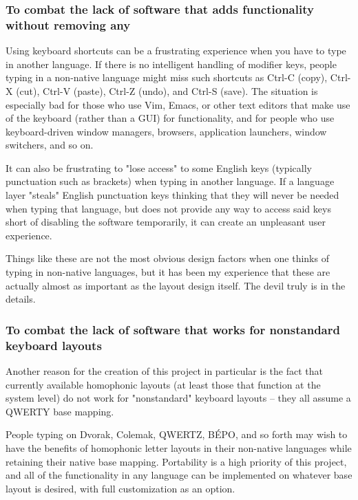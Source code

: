\documentclass[11pt]{article}
\begin{document}
\subsubsection{To combat the lack of software that adds functionality without removing any}
\label{sec:org1dcacb0}

Using keyboard shortcuts can be a frustrating experience when you have to type in another language. If there is no intelligent handling of modifier keys, people typing in a non-native language might miss such shortcuts as Ctrl-C (copy), Ctrl-X (cut), Ctrl-V (paste), Ctrl-Z (undo), and Ctrl-S (save). The situation is especially bad for those who use Vim, Emacs, or other text editors that make use of the keyboard (rather than a GUI) for functionality, and for people who use keyboard-driven window managers, browsers, application launchers, window switchers, and so on.

It can also be frustrating to "lose access" to some English keys (typically punctuation such as brackets) when typing in another language. If a language layer "steals" English punctuation keys thinking that they will never be needed when typing that language, but does not provide any way to access said keys short of disabling the software temporarily, it can create an unpleasant user experience.

Things like these are not the most obvious design factors when one thinks of typing in non-native languages, but it has been my experience that these are actually almost as important as the layout design itself. The devil truly is in the details.

\subsubsection{To combat the lack of software that works for nonstandard keyboard layouts}
\label{sec:org18929b3}

Another reason for the creation of this project in particular is the fact that currently available homophonic layouts (at least those that function at the system level) do not work for "nonstandard" keyboard layouts -- they all assume a QWERTY base mapping.

People typing on Dvorak, Colemak, QWERTZ, BÉPO, and so forth may wish to have the benefits of homophonic letter layouts in their non-native languages while retaining their native base mapping. Portability is a high priority of this project, and all of the functionality in any language can be implemented on whatever base layout is desired, with full customization as an option.
\end{document}
